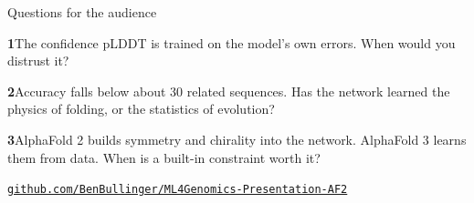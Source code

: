 \documentclass[11pt,aspectratio=169]{beamer}
\newcommand{\say}[1]{{\raggedright #1\par}\vspace{2.5mm}}
\begin{document}
\newif\ifexamslide \examslidefalse
\ifexamslide
\begin{frame}[t]{Exam question}
  \say{\textcolor{ETHGray}{The question from the course team.}}
  \say{\textcolor{ETHGray}{Our answer.}}
\end{frame}
\fi

\begin{frame}[t]{Questions for the audience}
  \vspace{2mm}
  \say{{\color{ETHRed}\bfseries 1}\enspace The confidence pLDDT is trained on the model's own errors. When would you distrust it?}
  \say{{\color{ETHRed}\bfseries 2}\enspace Accuracy falls below about 30 related sequences. Has the network learned the physics of folding, or the statistics of evolution?}
  \say{{\color{ETHRed}\bfseries 3}\enspace AlphaFold 2 builds symmetry and chirality into the network. AlphaFold 3 learns them from data. When is a built-in constraint worth it?}
  \vfill
  {\centering\scriptsize\href{https://github.com/BenBullinger/ML4Genomics-Presentation-AF2}{\color{ETHGray}\texttt{github.com/BenBullinger/ML4Genomics-Presentation-AF2}}\par}
\end{frame}
\end{document}
